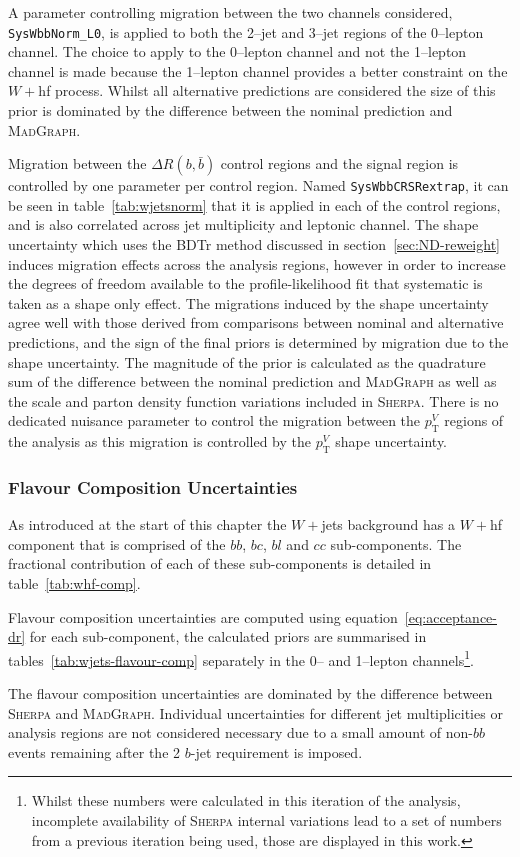 A parameter controlling migration between the two channels considered,
\texttt{SysWbbNorm\_L0}, is applied to both the 2--jet and 3--jet regions of the
0--lepton channel. The choice to apply to the 0--lepton channel and not the
1--lepton channel is made because the 1--lepton channel provides a better
constraint on the $W+$hf process. Whilst all alternative predictions are
considered the size of this prior is dominated by the difference between the
nominal prediction and \textsc{MadGraph}.

Migration between the $\Delta R(b, \bar{b})$ control regions and the signal
region is controlled by one parameter per control region. Named
\texttt{SysWbbCRSRextrap}, it can be seen in table~\ref{tab:wjetsnorm} that it is
applied in each of the control regions, and is also correlated across jet
multiplicity and leptonic channel. The shape uncertainty which uses the BDTr
method discussed in section~\ref{sec:ND-reweight} induces migration effects
across the analysis regions, however in order to increase the degrees of freedom
available to the profile-likelihood fit that systematic is taken as a shape only
effect. The migrations induced by the shape uncertainty agree well with those
derived from comparisons between nominal and alternative predictions, and the
sign of the final priors is determined by migration due to the shape
uncertainty. The magnitude of the prior is calculated as the quadrature sum of
the difference between the nominal prediction and \textsc{MadGraph} as well as
the scale and parton density function variations included in \textsc{Sherpa}.
There is no dedicated nuisance parameter to control the migration between the
$p_{\mathrm{T}}^V$ regions of the analysis as this migration is controlled by
the $p_{\mathrm{T}}^V$ shape uncertainty.

\subsubsection{Flavour Composition Uncertainties}

As introduced at the start of this chapter the $W+$jets background has a $W+$hf
component that is comprised of the $bb$, $bc$, $bl$ and $cc$ sub-components. The
fractional contribution of each of these sub-components is detailed in
table~\ref{tab:whf-comp}.

Flavour composition uncertainties are computed using
equation~\ref{eq:acceptance-dr} for each sub-component, the calculated priors
are summarised in tables~\ref{tab:wjets-flavour-comp} separately in the 0-- and
1--lepton channels\footnote{Whilst these numbers were calculated in this
  iteration of the analysis, incomplete availability of \textsc{Sherpa} internal
  variations lead to a set of numbers from a previous iteration being used,
  those are displayed in this work.}.

The flavour composition uncertainties are dominated by the difference between
\textsc{Sherpa} and \textsc{MadGraph}. Individual uncertainties for different
jet multiplicities or analysis regions are not considered necessary due to a
small amount of non-$bb$ events remaining after the 2 $b$-jet requirement is
imposed.

